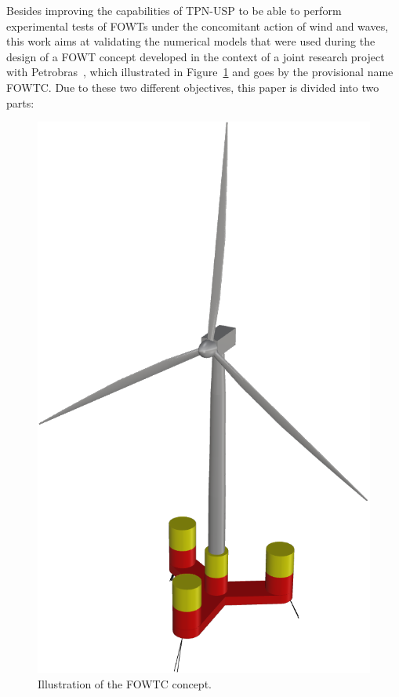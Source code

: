 Besides improving the capabilities of TPN-USP to be able to perform experimental tests of FOWTs under the concomitant action of wind and waves, this work aims at validating the numerical models that were used during the design of a FOWT concept developed in the context of a joint research project with Petrobras~\citep{mas2022parametric}, which illustrated in Figure~\ref{fig:intro:fowtc} and goes by the provisional name FOWTC. Due to these two different objectives, this paper is divided into two parts:
\begin{figure}[!hbtp]
	\centering
	\includegraphics[scale=0.30]{./figures/Perspectiva_semfundo.png}
	\caption{Illustration of the FOWTC concept.} \label{fig:intro:fowtc}
\end{figure}


